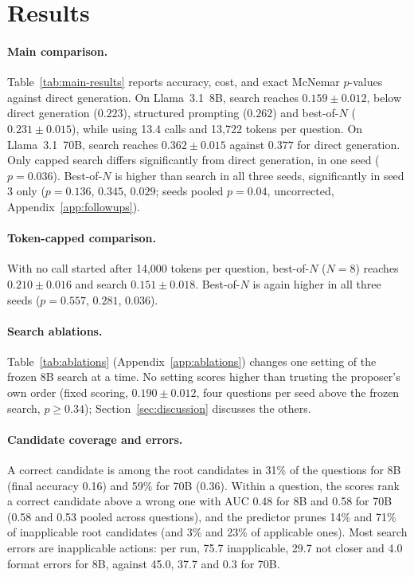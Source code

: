 \section{Results}
\label{sec:results}

\paragraph{Main comparison.}
Table~\ref{tab:main-results} reports accuracy, cost, and exact McNemar $p$-values against direct
generation. On Llama~3.1~8B, search reaches $0.159 \pm 0.012$, below direct generation ($0.223$),
structured prompting ($0.262$) and best-of-$N$ ($0.231 \pm 0.015$), while using 13.4 calls and
13,722 tokens per question. On Llama~3.1~70B, search reaches $0.362 \pm 0.015$ against $0.377$ for
direct generation. Only capped search differs significantly from direct generation, in one seed ($p = 0.036$). Best-of-$N$ is higher than search in all three seeds, significantly in seed 3 only ($p = 0.136$, $0.345$, $0.029$; seeds pooled $p = 0.04$, uncorrected, Appendix~\ref{app:followups}).



\paragraph{Token-capped comparison.}
With no call started after 14,000 tokens per question, best-of-$N$ ($N=8$) reaches $0.210 \pm 0.016$ and search $0.151 \pm 0.018$. Best-of-$N$ is again higher in all three seeds ($p = 0.557$, $0.281$, $0.036$).

\paragraph{Search ablations.}
Table~\ref{tab:ablations} (Appendix~\ref{app:ablations}) changes one setting of the frozen 8B search
at a time. No setting scores higher than trusting the proposer's own order (fixed scoring, $0.190 \pm 0.012$, four questions per seed above the frozen search, $p \ge 0.34$); Section~\ref{sec:discussion} discusses the others.

\paragraph{Candidate coverage and errors.}
A correct candidate is among the root candidates in 31\% of the questions for 8B (final accuracy 0.16) and 59\% for 70B (0.36). Within a question, the scores rank a correct candidate above a wrong one with AUC 0.48 for 8B and 0.58 for 70B (0.58 and 0.53 pooled across questions), and the predictor prunes 14\% and 71\% of inapplicable root candidates (and 3\% and 23\% of applicable ones). Most search errors are inapplicable actions: per run, 75.7 inapplicable, 29.7 not closer and
4.0 format errors for 8B, against 45.0, 37.7 and 0.3 for 70B.

